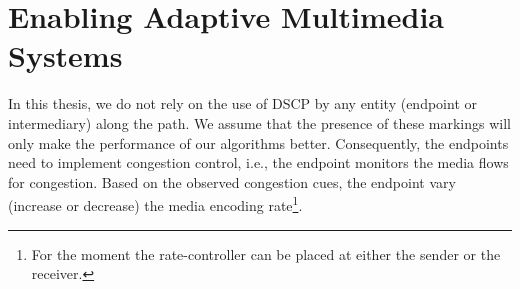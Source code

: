 


\section{Enabling Adaptive Multimedia Systems}
\label{rg.title}

In this thesis, we do not rely on the use of DSCP by any entity (endpoint or
intermediary) along the path. We assume that the presence of these markings
will only make the performance of our algorithms better. Consequently, the
endpoints need to implement congestion control, i.e., the endpoint monitors
the media flows for congestion. Based on the observed congestion cues, the
endpoint vary (increase or decrease) the media encoding rate\footnote{For the
moment the rate-controller can be placed at either the sender or the
receiver.}. 




